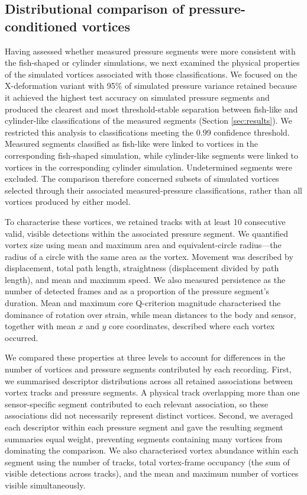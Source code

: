 \documentclass[openacc]{rsproca_new}
\begin{document}
\subsection{Distributional comparison of pressure-conditioned vortices}

Having assessed whether measured pressure segments were more consistent with the fish-shaped or cylinder simulations, we next examined the physical properties of the simulated vortices associated with those classifications. We focused on the X-deformation variant with 95\% of simulated pressure variance retained because it achieved the highest test accuracy on simulated pressure segments and produced the clearest and most threshold-stable separation between fish-like and cylinder-like classifications of the measured segments (Section \ref{sec:results}). We restricted this analysis to classifications meeting the 0.99 confidence threshold. Measured segments classified as fish-like were linked to vortices in the corresponding fish-shaped simulation, while cylinder-like segments were linked to vortices in the corresponding cylinder simulation. Undetermined segments were excluded. The comparison therefore concerned subsets of simulated vortices selected through their associated measured-pressure classifications, rather than all vortices produced by either model.

To characterise these vortices, we retained tracks with at least 10 consecutive valid, visible detections within the associated pressure segment. We quantified vortex size using mean and maximum area and equivalent-circle radius---the radius of a circle with the same area as the vortex. Movement was described by displacement, total path length, straightness (displacement divided by path length), and mean and maximum speed. We also measured persistence as the number of detected frames and as a proportion of the pressure segment's duration. Mean and maximum core Q-criterion magnitude characterised the dominance of rotation over strain, while mean distances to the body and sensor, together with mean $x$ and $y$ core coordinates, described where each vortex occurred.

We compared these properties at three levels to account for differences in the number of vortices and pressure segments contributed by each recording. First, we summarised descriptor distributions across all retained associations between vortex tracks and pressure segments. A physical track overlapping more than one sensor-specific segment contributed to each relevant association, so these associations did not necessarily represent distinct vortices. Second, we averaged each descriptor within each pressure segment and gave the resulting segment summaries equal weight, preventing segments containing many vortices from dominating the comparison. We also characterised vortex abundance within each segment using the number of tracks, total vortex-frame occupancy (the sum of visible detections across tracks), and the mean and maximum number of vortices visible simultaneously.
\end{document}
